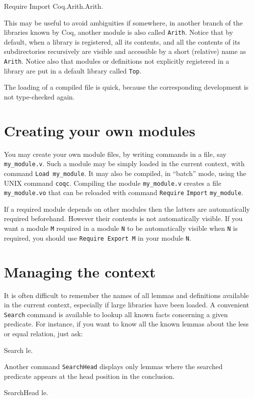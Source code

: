 \documentclass[11pt,a4paper]{book}
\begin{document}
\begin{coq_example*}
Require Import Coq.Arith.Arith.
\end{coq_example*}

This may be useful to avoid ambiguities if somewhere, in another branch
of the libraries known by Coq, another module is also called
\verb=Arith=. Notice that by default, when a library is registered,
all its contents, and all the contents of its subdirectories recursively are
visible and accessible by a short (relative) name as \verb=Arith=.
Notice also that modules or definitions not explicitly registered in
a library are put in a default library called \verb=Top=.

The loading of a compiled file is quick, because the corresponding
development is not type-checked again. 

\section{Creating your own modules}

You may create your own module files, by writing {\Coq} commands in a file,
say \verb:my_module.v:. Such a module may be simply loaded in the current
context, with command \verb:Load my_module:. It may also be compiled,
in ``batch'' mode, using the UNIX command
\verb:coqc:. Compiling the module \verb:my_module.v: creates a 
file \verb:my_module.vo:{} that can be reloaded with command
\verb:Require: \verb:Import: \verb:my_module:. 

If a required module depends on other modules then the latters are
automatically required beforehand. However their contents is not
automatically visible.  If you want a module \verb=M= required in a
module \verb=N= to be automatically visible when \verb=N= is required,
you should use \verb:Require Export M: in your module \verb:N:.

\section{Managing the context}

It is often difficult to remember the names of all lemmas and
definitions available in the current context, especially if large
libraries have been loaded. A convenient \verb:Search: command
is available to lookup all known facts 
concerning a given predicate. For instance, if you want to know all the
known lemmas about the less or equal relation, just ask:
\begin{coq_example}
Search le.
\end{coq_example}
Another command \verb:SearchHead: displays only lemmas where the searched
predicate appears at the head position in the conclusion.
\begin{coq_example}
SearchHead le.
\end{coq_example}
\end{document}
